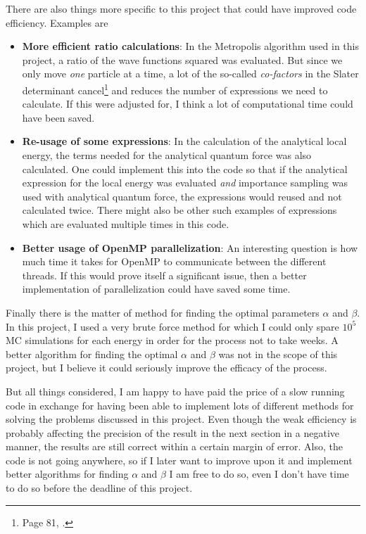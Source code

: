 There are also things more specific to this project that could have improved code efficiency. Examples are

\begin{itemize}
	\item \textbf{More efficient ratio calculations}:
	In the Metropolis algorithm used in this project, a ratio of the wave functions squared was evaluated. 
	But since we only move \textit{one} particle at a time, a lot of the so-called \textit{co-factors} in the Slater determinant cancel\footnote{Page 81, \cite{master}.} and reduces the number of expressions we need to calculate. If this were adjusted for, I think a lot of computational time could have been saved.
	\item \textbf{Re-usage of some expressions}:
	In the calculation of the analytical local energy, the terms needed for the analytical quantum force was also calculated. One could implement this into the code so that if the analytical expression for the local energy was evaluated \textit{and} importance sampling was used with analytical quantum force, the expressions would reused and not calculated twice. 
	There might also be other such examples of expressions which are evaluated multiple times in this code.
	\item \textbf{Better usage of OpenMP parallelization}:
	An interesting question is how much time it takes for OpenMP to communicate between the different threads.
	If this would prove itself a significant issue, then a better implementation of parallelization could have saved some time. 
\end{itemize}

Finally there is the matter of method for finding the optimal parameters $\alpha$ and $\beta$. 
In this project, I used a very brute force method for which I could only spare $10^5$ MC simulations for each energy in order for the process not to take weeks. 
A better algorithm for finding the optimal $\alpha$ and $\beta$ was not in the scope of this project, but I believe it could seriously improve the efficacy of the process.

But all things considered, I am happy to have paid the price of a slow running code in exchange for having been able to implement lots of different methods for solving the problems discussed in this project. 
Even though the weak efficiency is probably affecting the precision of the result in the next section in a negative manner, the results are still correct within a certain margin of error.
Also, the code is not going anywhere, so if I later want to improve upon it and implement better algorithms for finding $\alpha$ and $\beta$ I am free to do so, even I don't have time to do so before the deadline of this project. 









